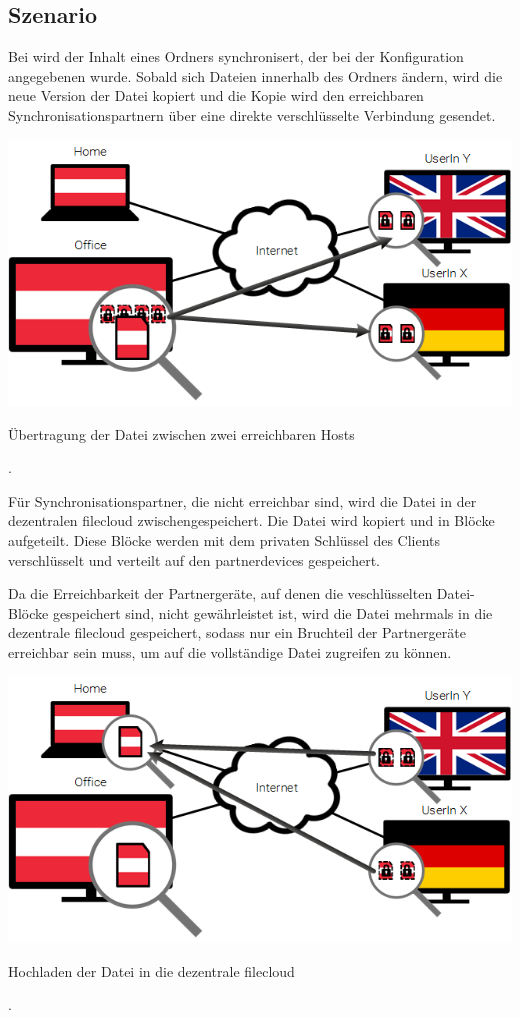 \subsection{Szenario}
Bei \sblit wird der Inhalt eines Ordners synchronisert, der bei der
Konfiguration angegebenen wurde. Sobald sich Dateien innerhalb des Ordners
ändern, wird die neue Version der Datei kopiert und die Kopie wird den
erreichbaren Synchronisationspartnern über eine direkte verschlüsselte Verbindung
gesendet.

\includegraphics[]{images/sblit_1}
\caption{Übertragung der Datei zwischen zwei erreichbaren Hosts}.

Für Synchronisationspartner, die nicht erreichbar sind, wird die Datei in der dezentralen
\gls{filecloud} zwischengespeichert. Die Datei wird kopiert und in Blöcke
aufgeteilt. Diese Blöcke werden mit dem privaten Schlüssel des Clients
verschlüsselt und verteilt auf den \glspl{partnerdevice} gespeichert.

Da die Erreichbarkeit der Partnergeräte, auf denen die veschlüsselten
Datei-Blöcke gespeichert sind, nicht gewährleistet ist, wird die Datei mehrmals
in die dezentrale \gls{filecloud} gespeichert, sodass nur ein Bruchteil der
Partnergeräte erreichbar sein muss, um auf die vollständige Datei zugreifen zu
können.

\includegraphics[]{images/sblit_2}
\caption{Hochladen der Datei in die dezentrale \gls{filecloud}}.

